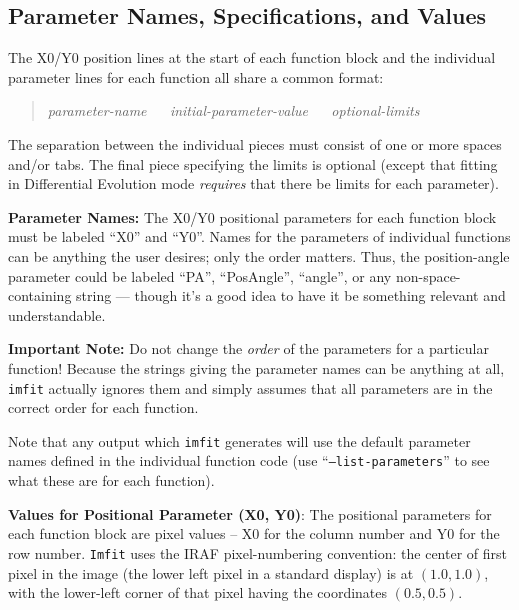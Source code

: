\documentclass[10pt]{article}
\newcommand{\imfit}{\texttt{imfit}}
\newcommand{\Imfit}{\texttt{Imfit}}
\begin{document}
\subsection{Parameter Names, Specifications, and Values}

The X0/Y0 position lines at the start of each function block and the
individual parameter lines for each function all share a common format:
\begin{quote}
\textit{parameter-name} ~~ \textit{initial-parameter-value} ~~ \textit{optional-limits}
\end{quote}
The separation between the individual pieces must consist of one or more spaces
and/or tabs. The final piece specifying the limits is optional (except that
fitting in Differential Evolution mode \textit{requires} that there be limits
for each parameter).

\bigskip

\textbf{Parameter Names:} The X0/Y0 positional parameters for each
function block must be labeled ``X0'' and ``Y0''. Names for the
parameters of individual functions can be anything the user desires;
only the order matters. Thus, the position-angle parameter could be
labeled ``PA'', ``PosAngle'', ``angle'', or any non-space-containing
string --- though it's a good idea to have it be something relevant
and understandable.

\textbf{Important Note:} Do not change the \textit{order} of the parameters
for a particular function!  Because the strings giving the parameter names
can be anything at all, \imfit{} actually ignores them and simply assumes
that all parameters are in the correct order for each function.

Note that any output which \imfit{} generates will use the default parameter
names defined in the individual function code (use ``\texttt{--list-parameters}''
to see what these are for each function).

\bigskip

\textbf{Values for Positional Parameter (X0, Y0)}: The positional parameters
for each function block are pixel values -- X0 for the column number and
Y0 for the row number. \Imfit{} uses the IRAF pixel-numbering
convention: the center of first pixel in the image (the lower left pixel
in a standard display) is at $(1.0,1.0)$, with the lower-left corner of that
pixel having the coordinates $(0.5,0.5)$.

\bigskip
\end{document}
